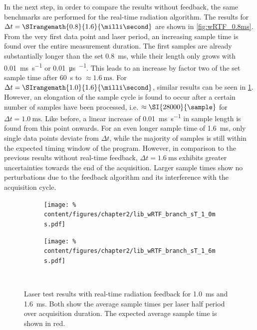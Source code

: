             In the next step, in order to compare the results without feedback, the same benchmarks are performed for the real-time radiation algorithm. The results for $\Delta t=\SIrangemath{0.8}{1.6}{\milli\second}$ are shown in \cref{fig:wRTF_0.8ms}. From the very first data point and laser period, an increasing sample time is found over the entire measurement duration. The first samples are already substantially longer than the set \SI{0.8}{\milli\second}, while their length only grows with \SI{0.01}{\milli\second\per\second} or \SI{0.01}{\micro\second\per\sample}. This leads to an increase by factor two of the set sample time after \SI{60}{\second} to $\approx\SI{1.6}{\milli\second}$. For $\Delta t=\SIrangemath{1.0}{1.6}{\milli\second}$, similar results can be seen in \cref{fig:wRTF_1.0_1.6ms}. However, an elongation of the sample cycle is found to occur after a certain number of samples have been processed, i.e. $\approx\SI{28000}{\sample}$ for $\Delta t=\SI{1.0}{\milli\second}$. Like before, a linear increase of \SI{0.01}{\milli\second\per\second} in sample length is found from this point onwards. For an even longer sample time of \SI{1.6}{\milli\second}, only single data points deviate from $\Delta t$, while the majority of samples is still within the expected timing window of the program. However, in comparison to the previous results without real-time feedback, $\Delta t=\SI{1.6}{\milli\second}$ exhibits greater uncertainties towards the end of the acquisition. Larger sample times show no perturbations due to the feedback algorithm and its interference with the acquisition cycle.\\%
%
            \begin{figure}[t]%
                \centering%
                \begin{subfigure}{0.48\textwidth}%
                    \texttt{[image: \%
                        content/figures/chapter2/lib\_wRTF\_branch\_sT\_1\_0ms.pdf]}%
                \end{subfigure}%
                \hspace*{0.25cm}%
                \begin{subfigure}{0.48\textwidth}%
                    \texttt{[image: \%
                        content/figures/chapter2/lib\_wRTF\_branch\_sT\_1\_6ms.pdf]}%
                \end{subfigure}\\%
                \caption{Laser test results with real-time radiation feedback for \SI{1.0}{\milli\second} and \SI{1.6}{\milli\second}. Both show the average sample times per laser half period over acquisition duration. The expected average sample time is shown in red.}\label{fig:wRTF_1.0_1.6ms}%
            \end{figure}%

